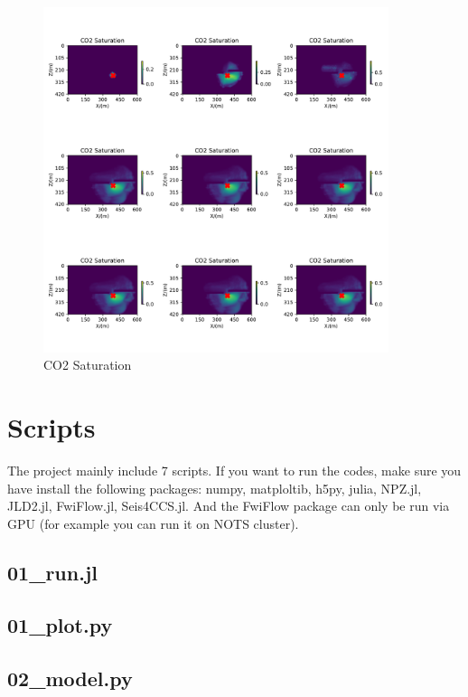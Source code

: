 \begin{figure}[H]
    \centering
    \includegraphics[width=0.9\textwidth]{figures/project/CO2_Saturation2.pdf}
    \caption{CO2 Saturation}
    \label{fig:CO2_Saturation2}
\end{figure}

\section{Scripts}
The project mainly include 7 scripts.
If you want to run the codes, make sure you have install the following packages: numpy, matploltib, h5py, julia, NPZ.jl, JLD2.jl, FwiFlow.jl, Seis4CCS.jl.
And the FwiFlow package can only be run via GPU (for example you can run it on NOTS cluster).

\subsection{01\_run.jl}

\subsection{01\_plot.py}

\subsection{02\_model.py}

